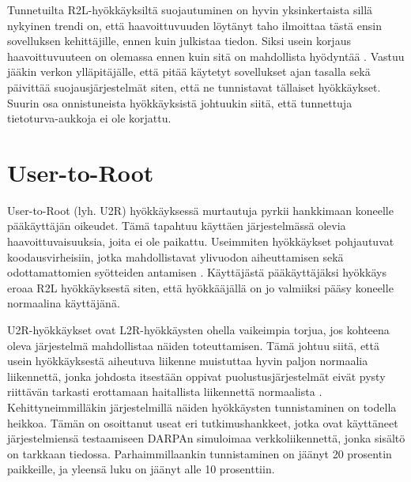 Tunnetuilta R2L-hyökkäyksiltä suojautuminen on hyvin yksinkertaista sillä
nykyinen trendi on, että haavoittuvuuden löytänyt taho ilmoittaa tästä ensin
sovelluksen kehittäjille, ennen kuin julkistaa tiedon. Siksi usein korjaus
haavoittuvuuteen on olemassa ennen kuin sitä on mahdollista hyödyntää \cite{IDSb}.
Vastuu jääkin verkon ylläpitäjälle, että pitää käytetyt sovellukset ajan
tasalla sekä päivittää suojausjärjestelmät siten, että ne tunnistavat tällaiset
hyökkäykset. Suurin osa onnistuneista hyökkäyksistä johtuukin siitä, että
tunnettuja tietoturva-aukkoja ei ole korjattu.

\section{User-to-Root}

User-to-Root (lyh. U2R) hyökkäyksessä murtautuja pyrkii hankkimaan
koneelle pääkäyttäjän oikeudet. Tämä tapahtuu käyttäen järjestelmässä
olevia haavoittuvaisuuksia, joita ei ole paikattu. Useimmiten
hyökkäykset pohjautuvat koodausvirheisiin, jotka mahdollistavat
ylivuodon aiheuttamisen sekä odottamattomien syötteiden antamisen
\cite{IDS}. Käyttäjästä pääkäyttäjäksi hyökkäys eroaa R2L hyökkäyksestä
siten, että hyökkääjällä on jo valmiiksi pääsy koneelle normaalina
käyttäjänä.

U2R-hyökkäykset ovat L2R-hyökkäysten ohella vaikeimpia torjua, jos kohteena
oleva järjestelmä mahdollistaa näiden toteuttamisen. Tämä johtuu siitä, että
usein hyökkäyksestä aiheutuva liikenne muistuttaa hyvin paljon normaalia
liikennettä, jonka johdosta itsestään oppivat puolustusjärjestelmät eivät pysty
riittävän tarkasti erottamaan haitallista liikennettä normaalista \cite{U2R}.
Kehittyneimmilläkin järjestelmillä näiden hyökkäysten tunnistaminen on todella
heikkoa. Tämän on osoittanut useat eri tutkimushankkeet, jotka ovat käyttäneet
järjestelmiensä testaamiseen DARPAn simuloimaa verkkoliikennettä, jonka sisältö
on tarkkaan tiedossa. Parhaimmillaankin tunnistaminen on jäänyt 20 prosentin
paikkeille, ja yleensä luku on jäänyt alle 10 prosenttiin.
